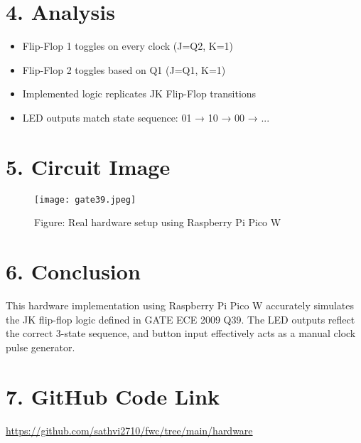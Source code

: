 \documentclass[12pt]{article}
\begin{document}
\begin{multicols}{2}
\end{multicols}

\newpage


\section*{4. Analysis}
\begin{itemize}
    \item Flip-Flop 1 toggles on every clock (J=Q2, K=1)
    \item Flip-Flop 2 toggles based on Q1 (J=Q1, K=1)
    \item Implemented logic replicates JK Flip-Flop transitions
    \item LED outputs match state sequence: 01 → 10 → 00 → ...
\end{itemize}

\section*{5. Circuit Image}
\begin{figure}[H]
    \centering
    \texttt{[image: gate39.jpeg]} %
    \caption*{Figure: Real hardware setup using Raspberry Pi Pico W}
\end{figure}
\newpage
\section*{6. Conclusion}
This hardware implementation using Raspberry Pi Pico W accurately simulates the JK flip-flop logic defined in GATE ECE 2009 Q39. The LED outputs reflect the correct 3-state sequence, and button input effectively acts as a manual clock pulse generator.
\section*{7. GitHub Code Link}
\url{https://github.com/sathvi2710/fwc/tree/main/hardware}
\end{document}
